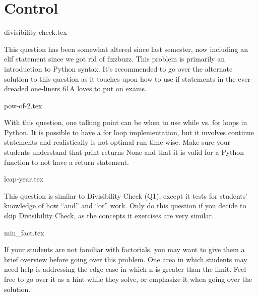 \documentclass{exam}
\begin{document}
\section{Control}
\begin{questions}
{divisibility-check.tex}
\begin{questionmeta}
  This question has been somewhat altered since last semester, now including an elif statement since we got rid of fizzbuzz. This problem is primarily an introduction to Python syntax.
  It's recommended to go over the alternate solution to this question as it touches upon how to use if statements in the ever-dreaded one-liners 61A loves to put on exams. 
\end{questionmeta}
{pow-of-2.tex}
\begin{questionmeta}
  With this question, one talking point can be when to use while vs. for loops in Python. It is possible to have a for loop implementation, but it involves continue statements and realistically is not optimal run-time wise.
  Make sure your students understand that print returns None and that it is valid for a Python function to not have a return statement.
\end{questionmeta}
{leap-year.tex}
\begin{questionmeta}
  This question is similar to Divisibility Check (Q1), except it tests for students' knowledge of how ``and'' and ``or'' work.
  Only do this question if you decide to skip Divisibility Check, as the concepts it exercises are very similar.
\end{questionmeta}
{min_fact.tex}
\begin{questionmeta}
  If your students are not familiar with factorials, you may want to give them a brief overview before going over this problem.
  One area in which students may need help is addressing the edge case in which n is greater than the limit. Feel free to go over it as a hint while they solve, or emphasize it when going over the solution.
\end{questionmeta}
\end{questions}
\end{document}
